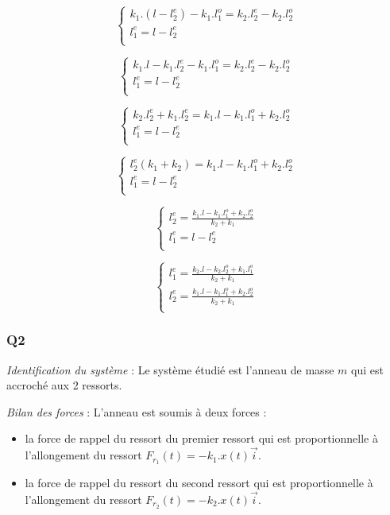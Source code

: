 \documentclass[]{book}
\theoremstyle{definition}
\begin{document}
$$
\left\{
\begin{array}{l}
 k_1.(l - l^{e}_{2}) - k_1.l^{o}_{1} = k_2.l^{e}_{2} - k_2.l^{o}_{2} \\
 l^{e}_{1}  = l - l^{e}_{2}\\
\end{array}
\right. 
$$

$$
\left\{
\begin{array}{l}
 k_1.l - k_1.l^{e}_{2} - k_1.l^{o}_{1} = k_2.l^{e}_{2} - k_2.l^{o}_{2} \\
 l^{e}_{1}  = l - l^{e}_{2}\\
\end{array}
\right. 
$$

$$
\left\{
\begin{array}{l}
 k_2.l^{e}_{2} + k_1.l^{e}_{2} = k_1.l  - k_1.l^{o}_{1} + k_2.l^{o}_{2}\\
 l^{e}_{1}  = l - l^{e}_{2}\\
\end{array}
\right. 
$$

$$
\left\{
\begin{array}{l}
 l^{e}_{2} (k_1+k_2) = k_1.l  - k_1.l^{o}_{1} + k_2.l^{o}_{2}\\
 l^{e}_{1}  = l - l^{e}_{2}\\
\end{array}
\right. 
$$

$$
\left\{
\begin{array}{l}
 l^{e}_{2} =  \frac{k_1.l - k_1.l^{o}_{1} + k_2.l^{o}_{2}}{k_2 + k_1} \\
 l^{e}_{1} = l - l^{e}_{2}\\
\end{array}
\right. 
$$

$$
\left\{
\begin{array}{l}
 l^{e}_{1} = \frac{k_2.l - k_2.l^{o}_{2} + k_1.l^{o}_{1}}{k_2 + k_1} \\
 l^{e}_{2} = \frac{k_1.l - k_1.l^{o}_{1} + k_2.l^{o}_{2}}{k_2 + k_1} \\
\end{array}
\right. 
$$


\subsubsection*{Q2}
\emph{Identification du syst\`eme} : Le syst\`eme \'etudi\'e est l'anneau de masse
$m$ qui est accroch\'e aux 2 ressorts.


\emph{Bilan des forces} : L'anneau est soumis \`a deux forces : 
\begin{itemize}
\item la force de rappel du ressort du premier ressort qui est proportionnelle \`a l'allongement
du ressort $F_{r_1}(t) = -k_1.x(t)\overrightarrow{i}$.
\item la force de rappel du ressort du second ressort qui est proportionnelle \`a l'allongement
du ressort $F_{r_2}(t) = -k_2.x(t)\overrightarrow{i}$.
\end{itemize}
\end{document}
